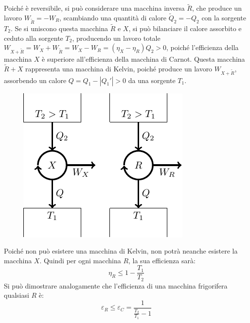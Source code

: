 \documentclass{article}
\numberwithin{equation}{subsection}
\begin{document}
Poiché è reversibile, si può considerare una macchina inversa $\tilde{R}$, che produce un lavoro $W_{\tilde{R}}=-W_R$, scambiando una quantità di calore 
$\tilde{Q}_2=-Q_2$ con la sorgente $T_2$. Se si uniscono questa macchina $\tilde R$ e $X$, si può bilanciare il calore assorbito e ceduto alla sorgente $T_2$, producendo 
un lavoro totale $W_{X+\tilde{R}}=W_X+W_{\tilde{R}}=W_X-W_R=(\eta_X-\eta_R)Q_2>0$, poiché l'efficienza della macchina $X$ è superiore all'efficienza della macchina di Carnot. 
Questa macchina $\tilde{R}+X$ rappresenta una macchina di Kelvin, poiché produce un lavoro $W_{X+\tilde{R}}$, assorbendo un calore $Q=Q_1-|Q_1'|>0$ da una sorgente $T_1$. 

\begin{figure}[H]%
    \centering
    \includegraphics{carnot-2.pdf}%
\end{figure}

Poiché non può esistere una macchina di Kelvin, non potrà neanche esistere la macchina $X$. Quindi per ogni macchina $R$, la sua efficienza sarà: 
\begin{equation*}
    \eta_R\leq1-\displaystyle\frac{T_1}{T_2}
\end{equation*}
Si può dimostrare analogamente che l'efficienza di una macchina frigorifera qualsiasi $R$ è: 
\begin{equation*}
    \varepsilon_R\leq\varepsilon_C=\displaystyle\frac{1}{\displaystyle\frac{T_2}{T_1}-1}
\end{equation*}
\end{document}
